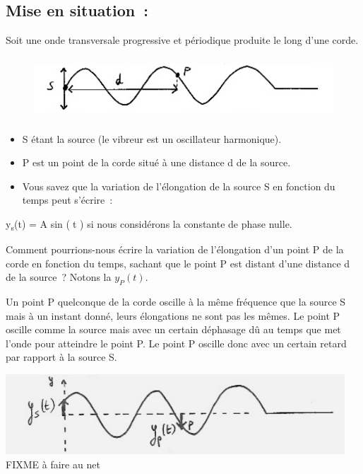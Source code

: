 \begin{multicols}{2}
\subsection{Mise en situation~: }

Soit une onde transversale progressive et périodique produite le long
d'une corde.
\begin{figure}
\centering
\includegraphics[width=13.645cm,height=2.305cm]{Pictures/10000001000003340000008AA6B62AF7250A4682.png}
\caption{}
\end{figure}

\begin{itemize}
\item
  S étant la source (le vibreur est un oscillateur harmonique).
\item
  P est un point de la corde situé à une distance d de la source.
\item
  Vous savez que la variation de l'élongation de la source S en fonction
  du temps peut s'écrire~:
\end{itemize}

y\textsubscript{s}(t) = A sin (t ) si nous considérons la constante de
phase nulle.

Comment pourrions-nous écrire la variation de l'élongation d'un point
  P de la corde en fonction du temps, sachant que le point P est distant
  d'une distance d de la source~? Notons la $y_P(t)$.

Un point P quelconque de la corde oscille à la même fréquence que la
source S mais à un instant donné, leurs élongations ne sont pas les
mêmes. Le point P oscille comme la source mais avec un certain déphasage
dû au temps que met l'onde pour atteindre le point P. Le point P oscille
donc avec un certain retard par rapport à la source S.

\includegraphics[width=12.696cm,height=2.99cm]{Pictures/100000010000034A000000C6944A1FC3E4803CD5.png}
FIXME à faire au net


\end{multicols}
